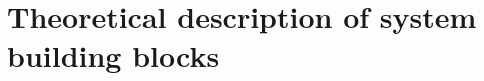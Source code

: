 \documentclass[a4paper,12pt]{report}
\begin{document}







%
%
%
%

%

\chapter{ Theoretical description of system building blocks}

%
%
%
%
%



\begingroup
\raggedright


\endgroup
\end{document}
